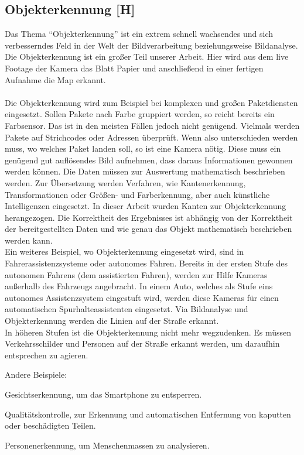 \subsection{Objekterkennung [H]}
Das Thema ``Objekterkennung'' ist ein extrem schnell wachsendes und sich verbesserndes Feld in der Welt der Bildverarbeitung beziehungsweise
Bildanalyse. \\
Die Objekterkennung ist ein großer Teil unserer Arbeit. Hier wird aus dem live Footage der Kamera das Blatt Papier und anschließend
in einer fertigen Aufnahme die Map erkannt.
\\
\\
Die Objekterkennung wird zum Beispiel bei komplexen und großen Paketdiensten eingesetzt. Sollen Pakete nach Farbe gruppiert werden, so
reicht bereits ein Farbsensor. Das ist in den meisten Fällen jedoch nicht genügend.
Vielmals werden Pakete auf Strichcodes oder Adressen überprüft.
Wenn also unterschieden werden muss, wo welches Paket landen soll, so ist eine Kamera nötig. Diese muss
ein genügend gut auflösendes Bild aufnehmen, dass daraus Informationen gewonnen werden können. Die Daten müssen zur Auswertung
mathematisch beschrieben werden. Zur Übersetzung werden Verfahren, wie Kantenerkennung, Transformationen oder Größen- und Farberkennung,
aber auch künstliche Intelligenzen
eingesetzt. In dieser Arbeit wurden Kanten zur Objekterkennung herangezogen.
Die Korrektheit des Ergebnisses ist abhängig von der Korrektheit der bereitgestellten Daten und wie genau das Objekt mathematisch
beschrieben werden kann.
\\
Ein weiteres Beispiel, wo Objekterkennung eingesetzt wird, sind in
Fahrerassistenzsysteme oder autonomes Fahren. Bereits in der ersten Stufe des autonomen Fahrens (dem assistierten Fahren),
werden zur Hilfe Kameras außerhalb des Fahrzeugs angebracht. In einem Auto, welches als Stufe eins autonomes Assistenzsystem
eingestuft wird, werden diese Kameras für einen automatischen Spurhalteassistenten eingesetzt. Via Bildanalyse und Objekterkennung
werden die Linien auf der Straße erkannt. \\
In höheren Stufen ist die Objekterkennung nicht mehr wegzudenken. Es müssen Verkehrsschilder und Personen auf der Straße erkannt
werden, um daraufhin entsprechen zu agieren.

Andere Beispiele:
\begin{compactitem}
    \item Gesichtserkennung, um das Smartphone zu entsperren.
    \item Qualitätskontrolle, zur Erkennung und automatischen Entfernung von kaputten oder beschädigten Teilen.
    \item Personenerkennung, um Menschenmassen zu analysieren.
\end{compactitem}

